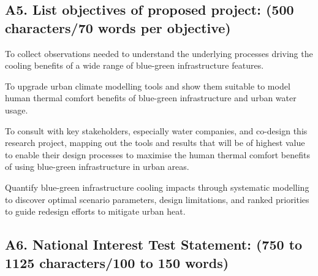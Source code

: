 \subsection*{\TitleFont A5. List objectives of proposed project: (500 characters/70 words per objective) }





To collect observations needed to understand the underlying processes driving the cooling benefits of a wide range of blue-green infrastructure features.

To upgrade urban climate modelling tools and show them suitable to model human thermal comfort benefits of blue-green infrastructure and urban water usage.

To consult with key stakeholders, especially water companies, and co-design this research project, mapping out the tools and results that will be of highest value to enable their design processes to maximise the human thermal comfort benefits of using blue-green infrastructure in urban areas.

Quantify blue-green infrastructure cooling impacts through systematic modelling to discover optimal scenario parameters, design limitations, and ranked priorities to guide redesign efforts to mitigate urban heat.


\subsection*{\TitleFont A6. National Interest Test Statement: (750 to 1125 characters/100 to 150 words) }

